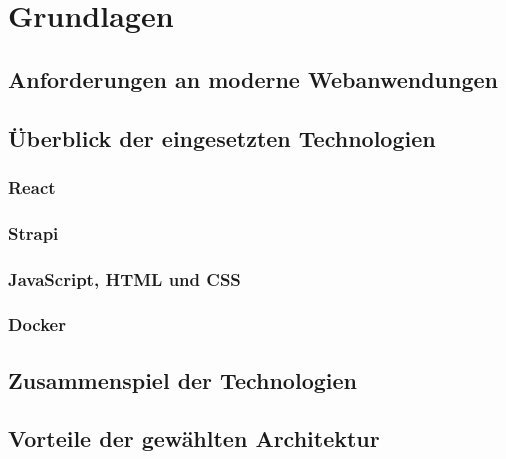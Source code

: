 \newpage

\section{Grundlagen} \label{grundlagen}
\subsection{Anforderungen an moderne Webanwendungen} \label{anforderungen}

\subsection{Überblick der eingesetzten Technologien} \label{eingestzeTechnologien}
\subsubsection{React} \label{react}

\subsubsection{Strapi} \label{strapi}

\subsubsection{JavaScript, HTML und CSS} \label{javaHtmlCss}

\subsubsection{Docker} \label{docker}


\subsection{Zusammenspiel der Technologien} \label{zusammenspiel}

\subsection{Vorteile der gewählten Architektur} \label{vorteile}

